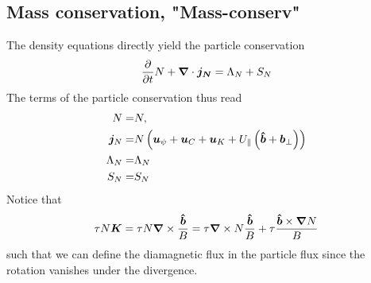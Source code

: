 \subsection{Mass conservation, "Mass-conserv"}
The density equations directly yield the particle conservation
\begin{align} \label{eq:mass_theorem}
  \frac{\partial}{\partial t} N
  + {\boldsymbol{\nabla}}\cdot{\boldsymbol{ j_{N}}}
  =  \Lambda_{N}+S_{N}
\end{align}
The terms of the particle conservation thus read
\begin{align}
  N= & N,\\
  {\boldsymbol{j}}_{N} =& N\left(
  {\boldsymbol{u}}_\psi + {\boldsymbol{u}}_C + {\boldsymbol{u}}_{K} +U_\parallel\left(\bm{\hat{b}}+{{\boldsymbol{b}}}_\perp\right)  \right)
\label{eq:particle_flux}\\
  \Lambda_{N} =& \Lambda_N
\\
  S_{N} =&  S_{N}
\end{align}
Notice that
\begin{align}
\tau N {\boldsymbol{K}} = \tau N{\boldsymbol{\nabla}}\times\frac{\bm{\hat{b}}}{B} = \tau {\boldsymbol{\nabla}}\times N\frac{\bm{\hat{b}}}{B} + \tau \frac{\bm{\hat{b}}\times{\boldsymbol{\nabla}} N}{B}
\label{}
\end{align}
such that we can define the diamagnetic flux in the particle flux since
the rotation vanishes under the divergence.

